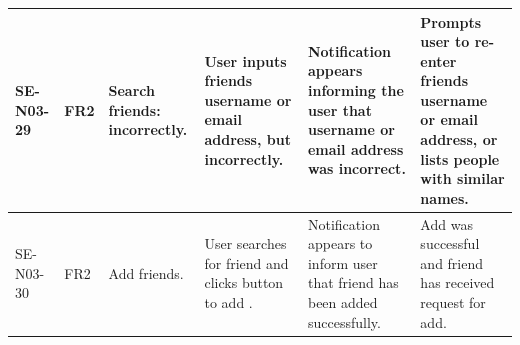 \documentclass[a4paper]{article}
\begin{document}
\begin{landscape}
\begin{center}
\begin{tabular}{| l | l | p{3cm} | p{3cm} | p{5cm} | p{7cm} |}
	\hline
	SE-N03-29 & FR2 & Search friends: incorrectly. & User inputs friends username or email address, but incorrectly. & Notification appears informing the user that username or email address was incorrect. & Prompts user to re-enter friends username or email address, or lists people with similar names.\\
	\hline
	SE-N03-30 & FR2 & Add friends. & User searches for friend and clicks button to add . & Notification appears to inform user that friend has been added successfully. & Add was successful and friend has received request for add. \\
	\hline
	
\end{tabular}
\end{center}

\clearpage


\end{landscape}
\end{document}
